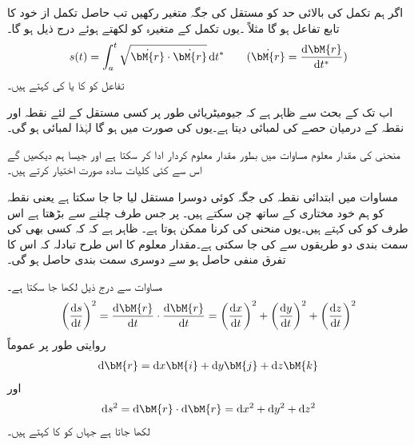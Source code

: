 اگر ہم تکمل کی بالائی حد کو مستقل  کی جگہ متغیر  رکھیں تب حاصل تکمل از خود  کا تابع تفاعل ہو گا مثلاً ۔یوں تکمل کے متغیرہ کو  لکھتے ہوئے درج ذیل ہو گا۔
\begin{align}\label{مساوات_الاحصاء_لمبائی_منحنی_ب}
s(t)=\int_a^t \sqrt{\dot{\bM{r}}\cdot \dot{\bM{r}}}\dif t^* \quad \quad (\dot{\bM{r}}=\frac{\dif \bM{r}}{\dif t^*})
\end{align}
تفاعل  کو  کا  یا  کی  کہتے ہیں۔  

اب تک کے بحث سے ظاہر ہے کہ جیومیٹریائی طور پر  کسی مستقل  کے لئے  نقطہ  اور نقطہ  کے درمیان حصے کی لمبائی دیتا ہے۔یوں  کی صورت میں  ہو گا لہٰذا لمبائی  ہو گی۔

منحنی کی مقدار معلوم مساوات میں  بطور مقدار معلوم کردار ادا کر سکتا ہے  اور جیسا ہم دیکھیں گے اس سے کئی کلیات سادہ صورت اختیار کرتے ہیں۔

مساوات  میں ابتدائی نقطہ  کی جگہ  کوئی دوسرا مستقل لیا جا جا سکتا ہے یعنی نقطہ  کو  ہم خود مختاری کے ساتھ چن سکتے ہیں۔ پر جس طرف چلنے سے  بڑھتا ہے اس  طرف کو  کی  کہتے ہیں۔یوں منحنی کی  کرنا ممکن ہوتا ہے۔ ظاہر ہے کہ کہ کسی بھی  کی سمت بندی دو طریقوں سے کی جا سکتی ہے۔مقدار معلوم کا اس طرح تبادلہ کہ اس کا تفرق منفی حاصل ہو سے  دوسری سمت بندی حاصل ہو گی۔

مساوات  سے درج ذیل لکھا جا سکتا ہے۔
\begin{align}\label{مساوات_الاحصاء_لمبائی_قوس_تفرق}
\left(\frac{\dif s}{\dif t}\right)^2=\frac{\dif \bM{r}}{\dif t}\cdot \frac{\dif \bM{r}}{\dif t}=\left(\frac{\dif x}{\dif t}\right)^2+\left(\frac{\dif y}{\dif t}\right)^2+\left(\frac{\dif z}{\dif t}\right)^2
\end{align}
روایتی طور پر عموماً
\begin{align*}
\dif \bM{r}=\dif x\bM{i}+\dif y\bM{j}+\dif z\bM{k}
\end{align*}
اور
\begin{align}\label{مساوات_الاحصاء_لمبائی_قوس_چھوٹا_حصہ}
\dif s^2=\dif \bM{r}\cdot \dif \bM{r}=\dif x^2+\dif y^2+\dif z^2
\end{align}
لکھا جاتا ہے جہاں  کو  کا  کہتے ہیں۔

